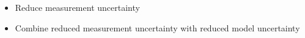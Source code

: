 \begin{itemize}
	\item Reduce measurement uncertainty 
	\item Combine reduced measurement uncertainty with reduced model
		uncertainty
\end{itemize}
